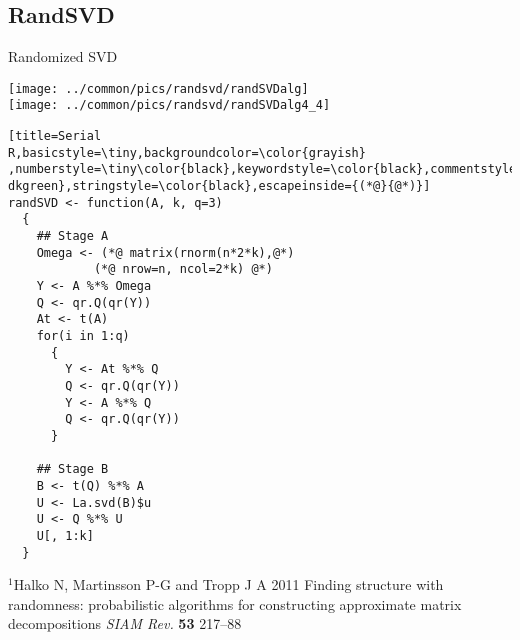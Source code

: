 \subsection{RandSVD}
\makesubcontentsslidessec


\begin{frame}[fragile]
\fontsize{8pt}{10}\selectfont
\begin{block}{Randomized SVD\footnotemark}
  \begin{minipage}{.55\textwidth}
    \begin{center}
      \texttt{[image: ../common/pics/randsvd/randSVDalg]}
      \\
      \texttt{[image: ../common/pics/randsvd/randSVDalg4\_4]}
    \end{center}
  \end{minipage}
  \begin{minipage}{0.430\textwidth}
\begin{lstlisting}[title=Serial 
R,basicstyle=\tiny,backgroundcolor=\color{grayish} 
,numberstyle=\tiny\color{black},keywordstyle=\color{black},commentstyle=\color{ 
dkgreen},stringstyle=\color{black},escapeinside={(*@}{@*)}]
randSVD <- function(A, k, q=3)
  {
    ## Stage A
    Omega <- (*@ matrix(rnorm(n*2*k),@*) 
            (*@ nrow=n, ncol=2*k) @*)
    Y <- A %*% Omega
    Q <- qr.Q(qr(Y))
    At <- t(A)
    for(i in 1:q)
      {
        Y <- At %*% Q
        Q <- qr.Q(qr(Y))
        Y <- A %*% Q
        Q <- qr.Q(qr(Y))
      }
    
    ## Stage B
    B <- t(Q) %*% A
    U <- La.svd(B)$u
    U <- Q %*% U
    U[, 1:k]
  }
\end{lstlisting} %
\end{minipage}
{\fontsize{6pt}{10}\selectfont $^1$Halko N, Martinsson P-G 
  and Tropp J A 2011 Finding structure with randomness: probabilistic 
algorithms 
  for constructing approximate matrix decompositions \emph{SIAM Rev.} 
\textbf{53} 
  217--88}
\end{block}
\end{frame}


